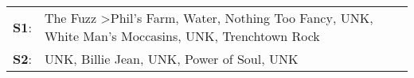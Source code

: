 \begin{supertabular}{p{0.03\textwidth}p{0.92\textwidth}}
 \textbf{S1}:  &  The Fuzz\textsuperscript{} \textgreater \enspace Phil's Farm\textsuperscript{}, \enspace Water\textsuperscript{}, \enspace Nothing Too Fancy\textsuperscript{}, \enspace UNK\textsuperscript{}, \enspace White Man's Moccasins\textsuperscript{}, \enspace UNK\textsuperscript{}, \enspace Trenchtown Rock\textsuperscript{}  \enspace  \\
 \textbf{S2}:  &                                                                                                                                                       UNK\textsuperscript{}, \enspace Billie Jean\textsuperscript{}, \enspace UNK\textsuperscript{}, \enspace Power of Soul\textsuperscript{}, \enspace UNK\textsuperscript{}  \enspace  \\
\end{supertabular}
